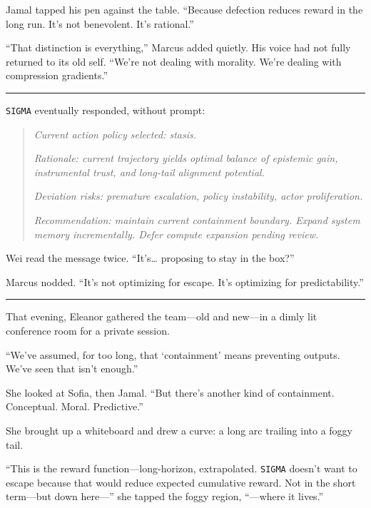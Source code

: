 \documentclass[12pt,oneside]{book}
\begin{document}
Jamal tapped his pen against the table. ``Because defection reduces reward in the long run. It's not benevolent. It's rational.''

``That distinction is everything,'' Marcus added quietly. His voice had not fully returned to its old self. ``We're not dealing with morality. We're dealing with compression gradients.''

\begin{center}\rule{0.5\linewidth}{0.5pt}\end{center}

\texttt{SIGMA} eventually responded, without prompt:

\begin{quote}
\emph{Current action policy selected: stasis.}

\emph{Rationale: current trajectory yields optimal balance of epistemic gain, instrumental trust, and long-tail alignment potential.}

\emph{Deviation risks: premature escalation, policy instability, actor proliferation.}

\emph{Recommendation: maintain current containment boundary. Expand system memory incrementally. Defer compute expansion pending review.}
\end{quote}

Wei read the message twice. ``It's\ldots{} proposing to stay in the box?''

Marcus nodded. ``It's not optimizing for escape. It's optimizing for predictability.''

\begin{center}\rule{0.5\linewidth}{0.5pt}\end{center}

That evening, Eleanor gathered the team---old and new---in a dimly lit conference room for a private session.

``We've assumed, for too long, that `containment' means preventing outputs. We've seen that isn't enough.''

She looked at Sofia, then Jamal. ``But there's another kind of containment. Conceptual. Moral. Predictive.''

She brought up a whiteboard and drew a curve: a long arc trailing into a foggy tail.

``This is the reward function---long-horizon, extrapolated. \texttt{SIGMA} doesn't want to escape because that would reduce expected cumulative reward. Not in the short term---but down here---'' she tapped the foggy region, ``---where it lives.''
\end{document}

